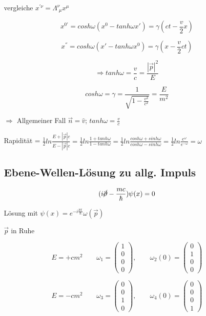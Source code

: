 vergleiche \(x^{'\nu} = \Lambda^\nu_{\,\,\mu}x^\mu\)


\[x^{0'} = cosh\omega(x^0-tanh\omega x') = \gamma(ct-\frac{v}{2}x)\]

\[x^{''} = cosh\omega(x'-tanh\omega x^0) = \gamma(x-\frac{v}{2}ct)\]

\[\Rightarrow tanh \omega = \frac{v}{c} = \frac{|\vec p|^2}{E}\]

\[cosh\omega =\gamma = \frac{1}{\sqrt{1-\frac{v^2}{c^2}}} = \frac{E}{m^2} \]


\(\Rightarrow \) Allgemeiner Fall \(\vec n = \hat v\); \(tanh\omega = \frac{v}{c}\)


Rapidität = \(\frac{1}{2} ln\frac{E+|\vec p|c}{E-|\vec p|c} =\frac{1}{2} ln\frac{1+tanh\omega}{1-tanh\omega} = \frac{1}{2} ln\frac{cosh\omega+sinh\omega}{cosh\omega-sinh\omega}  = \frac{1}{2}ln\frac{e^\omega}{e^{-\omega}} =\omega \)


\subsection{Ebene-Wellen-Lösung zu allg. Impuls}

\[(i\cancel \partial - \frac{mc}{\hbar})\psi(x) = 0\]

Lösung mit \(\psi(x) = e^{-i\frac{px}{\hbar}}\omega(\vec p)\)

\(\vec p\) in Ruhe

\[E = +cm^2\qquad \omega_1 = \begin{pmatrix} 1\\ 0 \\ 0\\ 0 \end{pmatrix},\qquad \omega_2(0) = \begin{pmatrix} 0\\ 1 \\ 0\\ 0 \end{pmatrix} \]

\[E = -cm^2\qquad \omega_3 = \begin{pmatrix} 0\\ 0 \\ 1\\ 0 \end{pmatrix},\qquad  \omega_4(0) = \begin{pmatrix} 0\\ 0 \\ 0\\ 1 \end{pmatrix} \]

